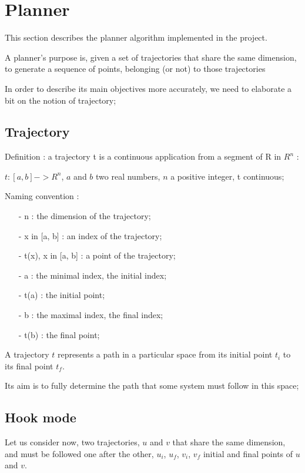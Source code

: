 
\section{Planner}

This section describes the planner algorithm implemented in the project.


A planner's purpose is, given a set of trajectories that share the same dimension, to generate a sequence of points,
belonging (or not) to those trajectories


In order to describe its main objectives more accurately, we need to elaborate a bit on the notion of trajectory;


\subsection{Trajectory}

Definition : a trajectory t is a continuous application from a segment of R in $R^n$ :\newline

$t : [a, b] -> R^n$, $a$ and $b$ two real numbers, $n$ a positive integer, t continuous;

Naming convention : 
\begin{itemize}
\item [-] n : the dimension of the trajectory;
\item [-] x in [a, b] : an index of the trajectory;
\item [-] t(x), x in [a, b] : a point of the trajectory;
\item [-] a : the minimal index, the initial index;
\item [-] t(a) : the initial point;
\item [-] b : the maximal index, the final index;
\item [-] t(b) : the final point;\newline
\end{itemize}

A trajectory $t$ represents a path in a particular space from its initial point $t_i$ to its final point $t_f$.

Its aim is to fully determine the path that some system must follow in this space;


\subsection{Hook mode}

Let us consider now, two trajectories, $u$ and $v$ that share the same dimension, and must be followed one after the
other, $u_i$, $u_f$, $v_i$, $v_f$ initial and final points of $u$ and $v$.


